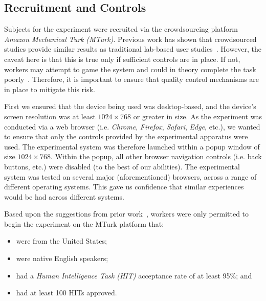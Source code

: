 

\subsection{Recruitment and Controls}\label{sec:method:subjects}
Subjects for the experiment were recruited via the crowdsourcing platform \emph{Amazon Mechanical Turk (MTurk)}. Previous work has shown that crowdsourced studies provide similar results as traditional lab-based user studies~\cite{kelly2011remote,zuccon2013crowdsourcing}. However, the caveat here is that this is true only if sufficient controls are in place. If not, workers may attempt to game the system and could in theory complete the task poorly~\cite{feild2010turkers}. Therefore, it is important to ensure that quality control mechanisms are in place to mitigate this risk.

First we ensured that the device being used was desktop-based, and the device's screen resolution was at least $1024 \times 768$ or greater in size. As the experiment was conducted via a web browser (i.e. \emph{Chrome}, \emph{Firefox}, \emph{Safari}, \emph{Edge}, etc.), we wanted to ensure that only the controls provided by the experimental apparatus were used. The experimental system was therefore launched within a popup window of size $1024 \times 768$. Within the popup, all other browser navigation controls (i.e. back buttons, etc.) were disabled (to the best of our abilities). The experimental system was tested on several major (aforementioned) browsers, across a range of different operating systems. This gave us confidence that similar experiences would be had across different systems.

Based upon the suggestions from prior work~\cite{feild2010turkers,zuccon2013crowdsourcing}, workers were only permitted to begin the experiment on the MTurk platform that:

\begin{itemize}
\item were from the United States;
\item were native English speakers;
\item had a \emph{Human Intelligence Task (HIT)} acceptance rate of at least 95\%; and 
\item had at least 100 HITs approved.
\end{itemize}

